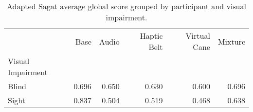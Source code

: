 
\begin{table}[!htb]
\centering
\caption{Adapted Sagat average global score grouped by participant and visual impairment.}
\label{tab:sagat_average_group}
\begin{tabular}{lrrrrr}
\toprule
{} &  Base &  Audio &  Haptic Belt &  Virtual Cane &  Mixture \\
Visual Impairment &       &        &              &               &          \\
\midrule
Blind             & 0.696 &  0.650 &        0.630 &         0.600 &    0.696 \\
Sight             & 0.837 &  0.504 &        0.519 &         0.468 &    0.638 \\
\bottomrule
\end{tabular}
\end{table}

